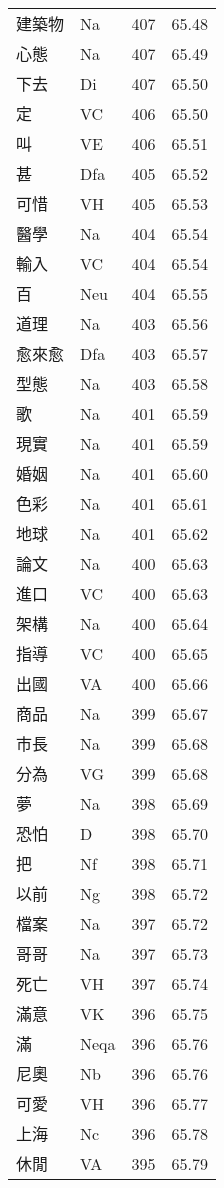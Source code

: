 \documentclass[twocolumn]{book}
\begin{document}
\begin{supertabular}{llrr}
建築物 & Na & 407 &  65.48\\
心態 & Na & 407 &  65.49\\
下去 & Di & 407 &  65.50\\
定 & VC & 406 &  65.50\\
叫 & VE & 406 &  65.51\\
甚 & Dfa & 405 &  65.52\\
可惜 & VH & 405 &  65.53\\
醫學 & Na & 404 &  65.54\\
輸入 & VC & 404 &  65.54\\
百 & Neu & 404 &  65.55\\
道理 & Na & 403 &  65.56\\
愈來愈 & Dfa & 403 &  65.57\\
型態 & Na & 403 &  65.58\\
歌 & Na & 401 &  65.59\\
現實 & Na & 401 &  65.59\\
婚姻 & Na & 401 &  65.60\\
色彩 & Na & 401 &  65.61\\
地球 & Na & 401 &  65.62\\
論文 & Na & 400 &  65.63\\
進口 & VC & 400 &  65.63\\
架構 & Na & 400 &  65.64\\
指導 & VC & 400 &  65.65\\
出國 & VA & 400 &  65.66\\
商品 & Na & 399 &  65.67\\
市長 & Na & 399 &  65.68\\
分為 & VG & 399 &  65.68\\
夢 & Na & 398 &  65.69\\
恐怕 & D & 398 &  65.70\\
把 & Nf & 398 &  65.71\\
以前 & Ng & 398 &  65.72\\
檔案 & Na & 397 &  65.72\\
哥哥 & Na & 397 &  65.73\\
死亡 & VH & 397 &  65.74\\
滿意 & VK & 396 &  65.75\\
滿 & Neqa & 396 &  65.76\\
尼奧 & Nb & 396 &  65.76\\
可愛 & VH & 396 &  65.77\\
上海 & Nc & 396 &  65.78\\
休閒 & VA & 395 &  65.79\\

\end{supertabular}
\end{document}
